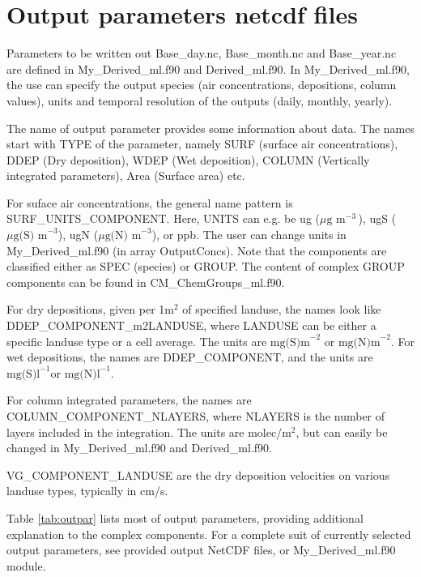 \documentclass[a4paper,12pt]{report}
\newcommand{\ug}{\ensuremath{\mu \mbox{g m}^{-3}}\,}
\newcommand{\ugN}{\ensuremath{\mu \mbox{g(N) m}^{-3}}}
\newcommand{\ugS}{\ensuremath{\mu \mbox{g(S) m}^{-3}}}
\newcommand{\mgSl}{\ensuremath{\mbox{mg(S)l}^{-1}}}
\newcommand{\mgNl}{\ensuremath{\mbox{mg(N)l}^{-1}}}
\newcommand{\mgSm}{\ensuremath{\mbox{mg(S)m}^{-2}}}
\newcommand{\mgNm}{\ensuremath{\mbox{mg(N)m}^{-2}}}
\begin{document}

\newpage
\section{Output parameters netcdf files}\label{sec:OutputParam}

Parameters to be written out Base\_day.nc, Base\_month.nc and Base\_year.nc are defined in
My\_Derived\-\_ml.f90 and Derived\_ml.f90. In My\_Derived\_ml.f90, the
use can specify the output species (air concentrations, depositions,
column values), units and temporal resolution of the outputs (daily,
monthly, yearly).

The name of output parameter provides some information about data. The
names start with TYPE of the parameter, namely SURF (surface air
concentrations), DDEP (Dry deposition), WDEP (Wet deposition), COLUMN
(Vertically integrated parameters), Area (Surface area) etc.   

For suface air concentrations, the general name pattern is
SURF\_UNITS\_COMPONENT. Here, UNITS can e.g. be ug (\ug), ugS (\ugS),
ugN (\ugN), or ppb. The user can change units in My\_Derived\_ml.f90
(in array OutputConcs). Note that the components are classified either
as SPEC (species) or GROUP. The content of complex GROUP components
can be found in CM\_ChemGroups\-\_ml.f90.

For dry depositions, given per 1m$^{2}$ of specified landuse, the
names look like  DDEP\_COMPONENT\-\_m2\-LAND\-USE, where LANDUSE can be
either a specific landuse type or a cell average. The units are \mgSm
or \mgNm. For wet depositions, the names are DDEP\_COMPONENT, and the
units are \mgSl or \mgNl.

For column integrated parameters, the names are
COLUMN\_COMPONENT\_NLAYERS, where NLAYERS is the number of layers
included in the integration. The units are molec/m$^2$, but can easily
be changed in My\_Derived\_ml.f90 and Derived\_ml.f90.

VG\_COMPONENT\_LANDUSE are the dry deposition velocities on various
landuse types, typically in cm/s.


Table \ref{tab:outpar} lists most of output parameters, providing
additional explanation to the complex components. For a complete suit
of currently selected output parameters, see provided output
NetCDF files, or My\_Derived\_ml.f90 module.

\end{document}
